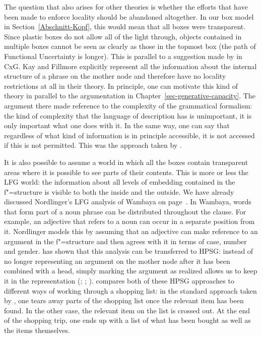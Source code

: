 The question that also arises for other theories is whether the efforts that have been made to enforce locality should be abandoned altogether.
In our box model in Section~\ref{Abschnitt-Kopf}, this would mean that all boxes were transparent. Since plastic boxes do not allow
all of the light through, objects contained in multiple boxes cannot be seen as clearly as those in the topmost box (the path
of Functional Uncertainty is longer). This is parallel to a suggestion made by
\citet{KF99a} in CxG\indexcxg. Kay and Fillmore explicitly represent all the information about the internal structure of a phrase on the mother
node and therefore have no locality restrictions at all in their theory. In principle, one can
motivate this kind of theory in parallel to the argumentation in Chapter~\ref{sec-generative-capacity}. The argument
there made reference to the complexity of the grammatical formalism: the kind of complexity that the
language of description has is unimportant, it is only important what one does with it. In the same way, one can say that regardless of what kind of information
is  in principle accessible, it is not accessed if this is not permitted. This was the approach taken by \citet[--145]{ps}.

It\label{page-Bender-Wambaya-two} is also possible to assume a world in which all the boxes contain transparent areas where it is possible to see parts of their contents.
This is more or less the LFG world\indexlfg: the information about all levels of embedding contained in the f"=structure is
visible to both the inside and the outside. We have already discussed Nordlinger's \citeyearpar{Nordlinger98a-u} LFG analysis of Wambaya 
on page~\pageref{Seite-Bender-Wambaya}.
In Wambaya, words that form part of a noun phrase can be distributed throughout the clause. For example, an adjective that refers to a noun
can occur in a separate position from it. Nordlinger models this by assuming that an adjective can make reference to an argument in the f"=structure
and then agrees with it in terms of case, number and gender. \citet{Bender2008a} has shown that this analysis can be transferred to HPSG\indexhpsg:
instead of no longer representing an argument on the mother node after it has been combined with a head, simply marking the argument as realized
allows us to keep it in the representation (\citealp{Meurers99b}; \citealp{Prze99};
\citealp[Section~17.4]{MuellerLehrbuch1}). \citet[]{Meurers99b} compares both of these HPSG approaches to different ways of working through a shopping list: in the standard approach taken by \citet{ps2},
one tears away parts of the shopping list once the relevant item has been found. In the other case, the relevant item on the list is crossed out.
At the end of the shopping trip, one ends up with a list of what has been bought as well as the items themselves.
  
